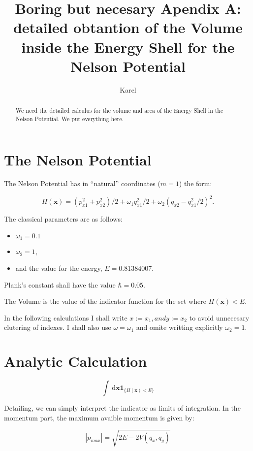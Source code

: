 \documentclass[a4paper,12pt]{article}
\title{ Boring but necesary Apendix A: detailed obtantion of the
Volume inside the Energy Shell for the Nelson Potential}
\author{Karel}
\newcommand{\xfase}{\mathbf{x}}
\newcommand{\dif}{\, \mathrm{d}}
\newcommand{\indicator}[1]{\mathbf{1}_{ \{   #1 \} } }
\begin{document}
\maketitle

\begin{abstract}
We need the detailed calculus for the volume and area of
the Energy Shell in the Nelson Potential. We put everything here.
\end{abstract}


\section{The Nelson Potential}

The Nelson Potential has in ``natural'' coordinates ($m=1$) the form:

\begin{equation}\label{classicalhamiltonian}
H(\xfase)=(p_{x1}^2+p_{x2}^2)/2+\omega_1 q_{x1}^2/2+
\omega_2(q_{x2}-q_{x1}^2/2)^2.
\end{equation}

The classical parameters are as follows:
\begin{itemize}
\item  $\omega_1=0.1$ 
\item $\omega_2=1$,
\item and the value for the energy, $E=0.81384007$.
\end{itemize}

Plank's constant shall have the value  $\hbar=0.05$.

The Volume is the value of the indicator function for
the set where $H(\xfase)<E$. 

In the following calculations I shall write $x:=x_1, and y:=x_2$
to avoid unnecesary clutering of indexes. I shall also use
$\omega=\omega_1$ and omite writting explicitly  $\omega_2=1$.

\section{Analytic Calculation}

\begin{equation}
\int \dif\xfase \indicator{H(\xfase)<E}
\end{equation}

Detailing, we can simply interpret the indicator as limits of integration.
In the momentum part, the maximum avaible momentum is given by:

\begin{equation}
|p_{max}|=\sqrt{2 E- 2 V(q_x, q_y)}
\end{equation}
\end{document}
